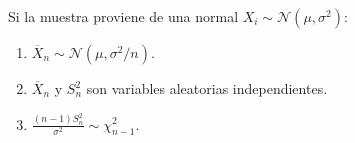 \begin{teorema}
Si la muestra proviene de una normal $X_i \sim \mathcal{N}(\mu, \sigma^2)$:
\begin{enumerate}
    \item $\overline{X}_n \sim \mathcal{N}(\mu, \sigma^2/n)$.
    \item $\overline{X}_n$ y $S_n^2$ son variables aleatorias independientes.
    \item $\frac{(n-1)S_n^2}{\sigma^2} \sim \chi^2_{n-1}$.
\end{enumerate}
\end{teorema}